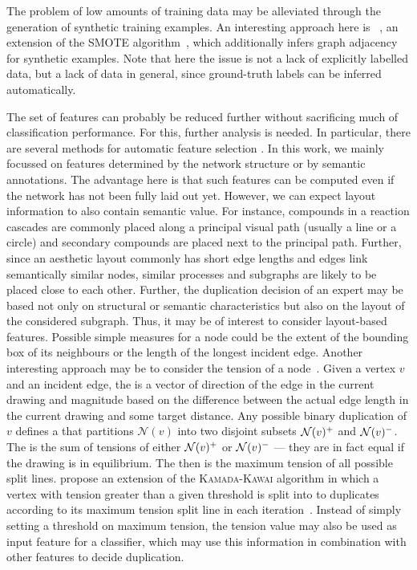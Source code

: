 \documentclass[
	fontsize=10pt, %
	twoside=true, %
	secnumdepth=1, %
  toc=indentunnumbered %
]{kaobook}
\begin{document}
The problem of low amounts of training data may be alleviated through the
generation of synthetic training examples. An interesting approach here is
~\cite{zhao_GraphSMOTEImbalancedNode_2021}, an extension of the
\textsc{SMOTE} algorithm~\cite{chawla_SMOTESyntheticMinority_2002}, which
additionally infers graph adjacency for synthetic examples. Note that here the
issue is not a lack of explicitly labelled data, but a lack of data in general,
since ground-truth labels can be inferred automatically.

The set of features can probably be reduced further without sacrificing much of
classification performance. For this, further analysis is needed. In particular,
there are several methods for automatic feature selection
\cite{chandrashekar_SurveyFeatureSelection_2014}.
In this work, we mainly focussed on features determined by
the network structure or by semantic annotations. The advantage here is that
such features can be computed even if the network has not been fully laid out
yet.
%
However, we can expect layout information to also contain semantic value. For
instance, compounds in a reaction cascades are commonly placed along a principal
visual path (usually a line or a circle) and secondary compounds are placed next
to the principal path. Further, since an aesthetic layout commonly has short
edge lengths and edges link semantically similar nodes, similar processes and
subgraphs are likely to be placed close to each other. Further, the duplication
decision of an expert may be based not only on structural or semantic
characteristics but also on the layout of the considered subgraph.
%
Thus, it may be of interest to consider layout-based features. Possible simple
measures for a node could be the extent of the bounding box of its neighbours or
the length of the longest incident edge. Another interesting approach may be to
consider the tension of a node~\cite{eades_VertexSplittingTensionfree_1996}.
Given a vertex $v$ and an incident edge, the  is a
vector of direction of the edge in the current drawing and magnitude based on
the difference between the actual edge length in the current drawing and some
target distance. Any possible binary duplication of $v$ defines a  that partitions $\mathcal{N}(v)$ into two disjoint subsets
$\mathcal{N}(v)^+$ and $\mathcal{N}(v)^-$. The  is the sum
of tensions of either $\mathcal{N}(v)^+$ or $\mathcal{N}(v)^-$ --- they are in fact equal
if the drawing is in equilibrium. The  then is the
maximum tension of all possible split lines.
\citeauthor{eades_VertexSplittingTensionfree_1996} propose an extension of the
\textsc{Kamada-Kawai} algorithm in which a vertex with tension greater than a
given threshold is split into to duplicates according to its maximum tension
split line in each iteration~\cite{eades_VertexSplittingTensionfree_1996}.
Instead of simply setting a threshold on maximum tension, the tension value may
also be used as input feature for a classifier, which may use this information
in combination with other features to decide duplication.
\end{document}
